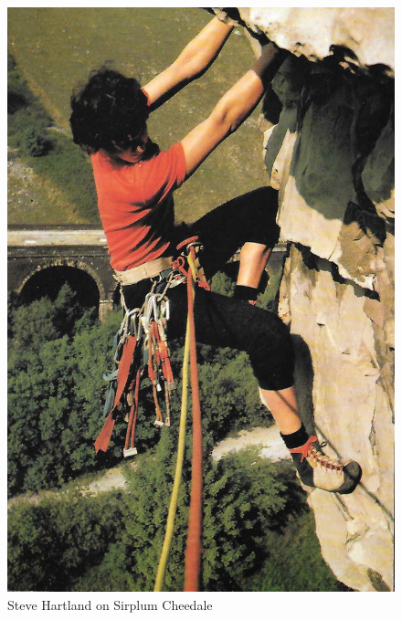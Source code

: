\documentclass[a5paper,openany,font 10pt]{scrbook}
\begin{document}
\begin{figure}[htb]
\centering
\includegraphics[width=.9\linewidth]{./images/Steve_Hartland_on_Sirplum_Cheedale.jpg}
\caption{\label{fig:orgc415be1}
Steve Hartland on Sirplum Cheedale}
\end{figure}
\end{document}
